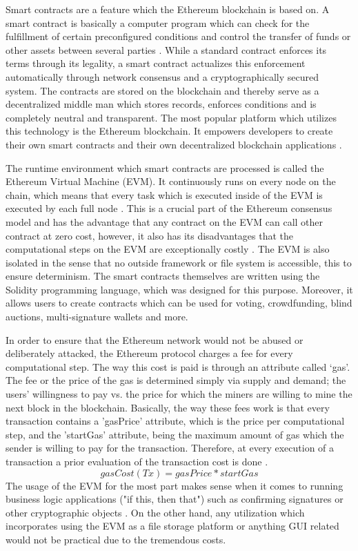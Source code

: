 Smart contracts are a feature which the Ethereum blockchain is based on. A smart contract is basically a computer program which can check for the fulfillment of certain preconfigured conditions and control the transfer of funds or other assets between several parties \cite{relatedWork38}. While a standard contract enforces its terms through its legality, a smart contract actualizes this enforcement automatically through network consensus and a cryptographically secured system. The contracts are stored on the blockchain and thereby serve as a decentralized middle man which stores records, enforces conditions and is completely neutral and transparent. The most popular platform which utilizes this technology is the Ethereum blockchain. It empowers developers to create their own smart contracts and their own decentralized blockchain applications \cite{relatedWork38}.

The runtime environment which smart contracts are processed is called the Ethereum Virtual Machine (EVM). It continuously runs on every node on the chain, which means that every task which is executed inside of the EVM is executed by each full node \cite{relatedWork38}. This is a crucial part of the Ethereum consensus model and has the advantage that any contract on the EVM can call other contract at zero cost, however, it also has its disadvantages that the computational steps on the EVM are exceptionally costly \cite{relatedWork38}. The EVM is also isolated in the sense that no outside framework or file system is accessible, this to ensure determinism. The smart contracts themselves are written using the Solidity programming language, which was designed for this purpose. Moreover, it allows users to create contracts which can be used for voting, crowdfunding, blind auctions, multi-signature wallets and more.

In order to ensure that the Ethereum network would not be abused or deliberately attacked, the Ethereum protocol charges a fee for every computational step. The way this cost is paid is through an attribute called ‘gas’. The fee or the price of the gas is determined simply via supply and demand; the users’ willingness to pay vs. the price for which the miners are willing to mine the next block in the blockchain. Basically, the way these fees work is that every transaction contains a 'gasPrice' attribute, which is the price per computational step, and the 'startGas' attribute, being the maximum amount of gas which the sender is willing to pay for the transaction. Therefore, at every execution of a transaction a prior evaluation of the transaction cost is done \cite{relatedWork38}.
$$ gasCost(Tx)= {gasPrice * startGas}$$
The usage of the EVM for the most part makes sense when it comes to running business logic applications ("if this, then that") such as confirming signatures or other cryptographic objects \cite{relatedWork39}. On the other hand, any utilization which incorporates using the EVM as a file storage platform or anything GUI related would not be practical due to the tremendous costs.


